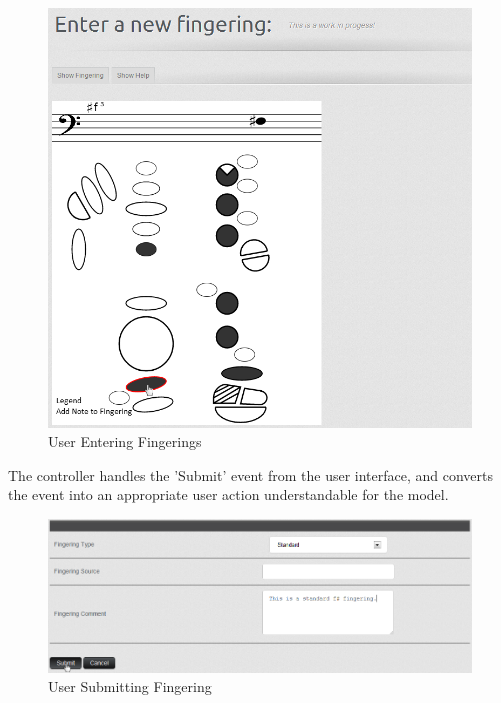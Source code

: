\documentclass[12pt,english]{article}
\begin{document}
\begin{figure}[H]
\caption{User Entering Fingerings}


\centering{}\includegraphics[scale=0.6]{view_enter}
\end{figure}


The controller handles the 'Submit' event from the user interface,
and converts the event into an appropriate user action understandable
for the model. 

\begin{figure}[H]
\caption{User Submitting Fingering}


\noindent \begin{centering}
\includegraphics[scale=0.45]{submit_add}
\par\end{centering}

\end{figure}
\end{document}
